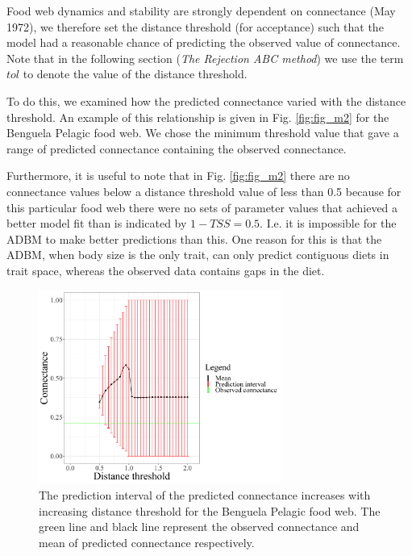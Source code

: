 \documentclass{article}
\begin{document}
Food web dynamics and stability are strongly dependent on connectance
(May 1972), we therefore set the distance threshold (for acceptance)
such that the model had a reasonable chance of predicting the observed
value of connectance. Note that in the following section (\emph{The
Rejection ABC method}) we use the term \(tol\) to denote the value of
the distance threshold.

To do this, we examined how the predicted connectance varied with the
distance threshold. An example of this relationship is given in Fig.
\ref{fig:fig_m2} for the Benguela Pelagic food web. We chose the minimum
threshold value that gave a range of predicted connectance containing
the observed connectance.

Furthermore, it is useful to note that in Fig. \ref{fig:fig_m2} there
are no connectance values below a distance threshold value of less than
0.5 because for this particular food web there were no sets of parameter
values that achieved a better model fit than is indicated by
\(1-TSS = 0.5\). I.e. it is impossible for the ADBM to make better
predictions than this. One reason for this is that the ADBM, when body
size is the only trait, can only predict contiguous diets in trait
space, whereas the observed data contains gaps in the diet.

\begin{figure}[h]

{\centering \includegraphics[width=300px]{fig/Benguela_Pelagic_connectanceCI_vs_tol} 

}

\caption{\label{fig:fig_m2}The prediction interval of the predicted connectance increases with increasing distance threshold for the Benguela Pelagic food web. The green line and black line represent the observed connectance and mean of predicted connectance respectively.}\label{fig:unnamed-chunk-4}
\end{figure}
\end{document}
